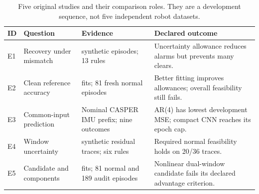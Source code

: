 \begin{table}[t]\centering
\caption{Five original studies and their comparison roles. They are a development sequence, not five independent robot datasets.}\label{tab:studies}
\begin{tabular}{>{\raggedright\arraybackslash}p{}>{\raggedright\arraybackslash}p{}>{\raggedright\arraybackslash}p{}>{\raggedright\arraybackslash}p{}}\toprule
ID & Question & Evidence & Declared outcome\\\midrule
E1 & Recovery under mismatch & 216 synthetic episodes; 13 rules & Uncertainty allowance reduces alarms but prevents many clears.\\
E2 & Clean reference accuracy & 63 fits; 81 fresh normal episodes & Better fitting improves allowances; overall feasibility still fails.\\
E3 & Common-input prediction & Nominal CASPER IMU prefix; nine outcomes & AR(4) has lowest development MSE; compact CNN reaches its epoch cap.\\
E4 & Window uncertainty & 36 synthetic residual traces; six rules & Required normal feasibility holds on 20/36 traces.\\
E5 & Candidate and components & 30 fits; 81 normal and 189 audit episodes & Nonlinear dual-window candidate fails its declared advantage criterion.\\\bottomrule
\end{tabular}
\end{table}
